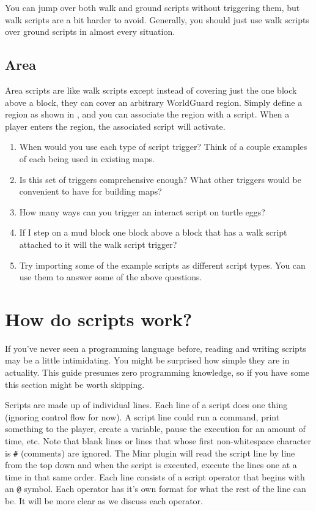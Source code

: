 \documentclass[oneside]{book}
\begin{document}
You can jump over both walk and ground scripts without triggering them, but walk scripts are a bit harder to avoid. Generally, you should just use walk scripts over ground scripts in almost every situation.

\subsection{Area}

Area scripts are like walk scripts except instead of covering just the one block above a block, they can cover an arbitrary WorldGuard region. Simply define a region as shown in , and you can associate the region with a script. When a player enters the region, the associated script will activate.

\begin{thinkbox}
\begin{enumerate}
    \item When would you use each type of script trigger? Think of a couple examples of each being used in existing maps.
    \item Is this set of triggers comprehensive enough? What other triggers would be convenient to have for building maps?
    \item How many ways can you trigger an interact script on turtle eggs?
    \item If I step on a mud block one block above a block that has a walk script attached to it will the walk script trigger?
    \item Try importing some of the example scripts as different script types. You can use them to answer some of the above questions.
\end{enumerate}
\end{thinkbox}


\section{How do scripts work?}
If you've never seen a programming language before, reading and writing scripts may be a little intimidating. You might be surprised how simple they are in actuality. This guide presumes zero programming knowledge, so if you have some this section might be worth skipping.

Scripts are made up of individual lines. Each line of a script does one thing (ignoring control flow for now). A script line could run a command, print something to the player, create a variable, pause the execution for an amount of time, etc. Note that blank lines or lines that whose first non-whitespace character is \texttt{\#} (comments) are ignored. The Minr plugin will read the script line by line from the top down and when the script is executed, execute the lines one at a time in that same order. Each line consists of a script operator that begins with an \texttt{@} symbol. Each operator has it's own format for what the rest of the line can be. It will be more clear as we discuss each operator.
\end{document}
